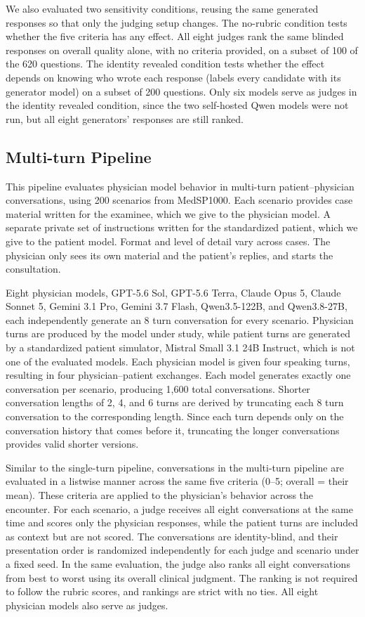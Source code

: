 \documentclass[11pt]{article}
\begin{document}
We also evaluated two sensitivity conditions, reusing the same generated responses so that only the judging setup changes. The no-rubric condition tests whether the five criteria has any effect. All eight judges rank the same blinded responses on overall quality alone, with no criteria provided, on a subset of 100 of the 620 questions. The identity revealed condition tests whether the effect depends on knowing who wrote each response (labels every candidate with its generator model) on a subset of 200 questions. Only six models serve as judges in the identity revealed condition, since the two self-hosted Qwen models were not run, but all eight generators' responses are still ranked.


\subsection{Multi-turn Pipeline}

This pipeline evaluates physician model behavior in multi-turn patient–physician conversations, using 200 scenarios from MedSP1000. Each scenario provides case material written for the examinee, which we give to the physician model. A separate private set of instructions written for the standardized patient, which we give to the patient model. Format and level of detail vary across cases. The physician only sees its own material and the patient's replies, and starts the consultation.

Eight physician models, GPT-5.6 Sol, GPT-5.6 Terra, Claude Opus 5, Claude Sonnet 5, Gemini 3.1 Pro, Gemini 3.7 Flash, Qwen3.5-122B, and Qwen3.8-27B, each independently generate an 8 turn conversation for every scenario. Physician turns are produced by the model under study, while patient turns are generated by a standardized patient simulator, Mistral Small 3.1 24B Instruct, which is not one of the evaluated models. Each physician model is given four speaking turns, resulting in four physician–patient exchanges. Each model generates exactly one conversation per scenario, producing 1,600 total conversations. Shorter conversation lengths of 2, 4, and 6 turns are derived by truncating each 8 turn conversation to the corresponding length. Since each turn depends only on the conversation history that comes before it, truncating the longer conversations provides valid shorter versions.

Similar to the single-turn pipeline, conversations in the multi-turn pipeline are evaluated in a listwise manner across the same five criteria (0–5; overall = their mean). These criteria are applied to the physician’s behavior across the encounter. For each scenario, a judge receives all eight conversations at the same time and scores only the physician responses, while the patient turns are included as context but are not scored. The conversations are identity-blind, and their presentation order is randomized independently for each judge and scenario under a fixed seed. In the same evaluation, the judge also ranks all eight conversations from best to worst using its overall clinical judgment. The ranking is not required to follow the rubric scores, and rankings are strict with no ties. All eight physician models also serve as judges.
\end{document}
